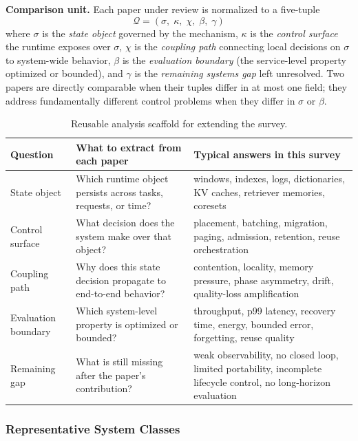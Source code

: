 \documentclass[acmsmall,screen,review]{acmart}
\begin{document}
\smallskip\noindent\textbf{Comparison unit.}
Each paper under review is normalized to a five-tuple
\[
\mathcal{Q}=(\sigma,\;\kappa,\;\chi,\;\beta,\;\gamma)
\]
where \(\sigma\) is the \emph{state object} governed by the mechanism,
\(\kappa\) is the \emph{control surface} the runtime exposes over \(\sigma\),
\(\chi\) is the \emph{coupling path} connecting local decisions on \(\sigma\) to system-wide behavior,
\(\beta\) is the \emph{evaluation boundary} (the service-level property optimized or bounded), and
\(\gamma\) is the \emph{remaining systems gap} left unresolved.
Two papers are directly comparable when their tuples differ in at most one field; they address fundamentally different control problems when they differ in \(\sigma\) or \(\beta\).

\begin{table}[t]
\small
\caption{Reusable analysis scaffold for extending the survey.}
\label{tab:scaffold}
\begin{tabularx}{\textwidth}{>{\raggedright\arraybackslash}p{}YY}
\toprule
Question & What to extract from each paper & Typical answers in this survey \\
\midrule
State object & Which runtime object persists across tasks, requests, or time? & windows, indexes, logs, dictionaries, KV caches, retriever memories, coresets \\

Control surface & What decision does the system make over that object? & placement, batching, migration, paging, admission, retention, reuse orchestration \\

Coupling path & Why does this state decision propagate to end-to-end behavior? & contention, locality, memory pressure, phase asymmetry, drift, quality-loss amplification \\

Evaluation boundary & Which system-level property is optimized or bounded? & throughput, p99 latency, recovery time, energy, bounded error, forgetting, reuse quality \\

Remaining gap & What is still missing after the paper's contribution? & weak observability, no closed loop, limited portability, incomplete lifecycle control, no long-horizon evaluation \\
\bottomrule
\end{tabularx}
\end{table}

\subsubsection{Representative System Classes}
\end{document}
